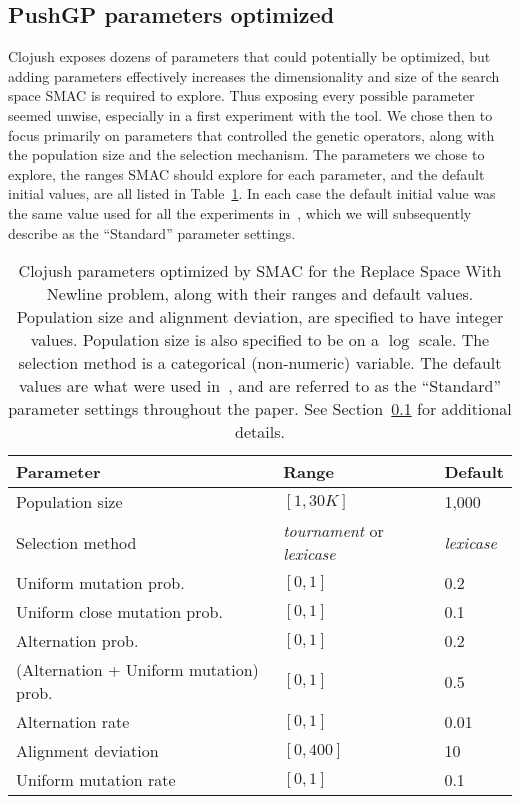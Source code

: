 \subsection{PushGP parameters optimized}
\label{sec:parametersOptimized}

Clojush exposes dozens of parameters that could potentially be optimized, but
adding parameters effectively increases the dimensionality and size of the
search space SMAC is required to explore. Thus exposing every possible parameter
seemed unwise, especially in a first experiment with the tool. We chose then
to focus primarily on parameters that controlled the genetic operators, along
with the population size and the selection mechanism. The parameters we chose 
to explore, the ranges SMAC should explore for each parameter, and the 
default initial values, are all listed in Table~\ref{tab:clojushParameters}.
In each case the default initial value was the same value used for all the
experiments in~\cite{Helmuth:2015:GECCO}, which we will subsequently
describe as the ``Standard'' parameter settings.

\begin{table}
	\begin{center}
	\begin{tabular}{p{4cm} p{2cm} l}
		Parameter & Range & Default \\
		\hline
		Population size & $[1, 30K]$ & 1,000 \\
		Selection method & \emph{tournament} \linebreak or \emph{lexicase} & \emph{lexicase} \\
		\hline
		Uniform mutation prob. & $[0, 1]$ & 0.2 \\
		Uniform close mutation prob. & $[0, 1]$ & 0.1 \\
		Alternation prob. & $[0, 1]$ & 0.2 \\
		(Alternation \linebreak + \quad Uniform mutation) prob. & $[0, 1]$ & 0.5 \\
		\hline
		Alternation rate & $[0, 1]$ & 0.01 \\
		Alignment deviation & $[0, 400]$ & 10 \\
		\hline
		Uniform mutation rate & $[0, 1]$ & 0.1
	\end{tabular}
	\end{center}
	\caption{Clojush parameters optimized by SMAC for the Replace Space With 
		Newline problem, along with their ranges and 
		default values.  Population size and
		alignment deviation, are specified to have integer values.  Population
		size is also specified to be on a $\log$ scale. The selection
		method is a categorical (non-numeric) variable. The default
		values are what were used in~\cite{Helmuth:2015:GECCO}, and
		are referred to as the ``Standard'' parameter settings throughout
		the paper.
		See Section~\ref{sec:parametersOptimized} for additional details.
	}
	\label{tab:clojushParameters}
\end{table}

